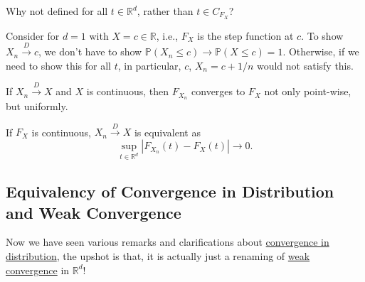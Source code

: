 \begin{problem*}
	Why not defined for all \(t \in \mathbb{R} ^d\), rather than \(t \in C_{F_X}\)?
\end{problem*}
\begin{answer}
	Consider for \(d = 1\) with \(X = c \in \mathbb{R} \), i.e., \(F_X\) is the step function at \(c\). To show \(X_n \overset{D}{\to } c\), we don't have to show \(\mathbb{P} (X_n \leq c) \to \mathbb{P} (X \leq c) = 1\). Otherwise, if we need to show this for all \(t\), in particular, \(c\), \(X_n = c + 1 / n\) would not satisfy this.
\end{answer}

If \(X_n \overset{D}{\to } X\) and \(X\) is continuous, then \(F_{X_n}\) converges to \(F_X\) not only point-wise, but uniformly.

\begin{remark}
	If \(F_X\) is continuous, \(X_n \overset{D}{\to } X\) is equivalent as
	\[
		\sup _{t\in \mathbb{R} ^d} \left\vert F_{X_n} (t) - F_X(t) \right\vert \to 0.
	\]
\end{remark}

\subsection{Equivalency of Convergence in Distribution and Weak Convergence}
Now we have seen various remarks and clarifications about \hyperref[def:converge-in-distribution]{convergence in distribution}, the upshot is that, it is actually just a renaming of \hyperref[def:converge-weakly]{weak convergence} in \(\mathbb{R} ^d\)!

